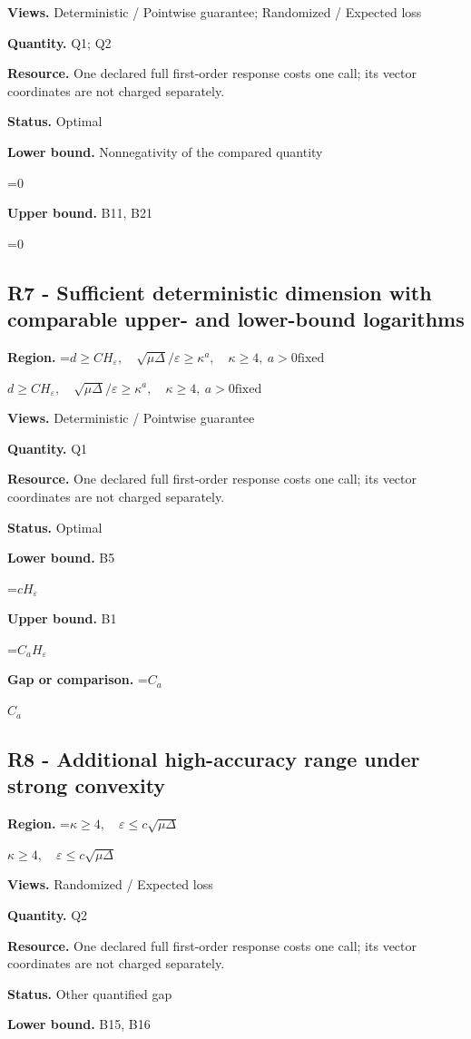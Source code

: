 \documentclass[10pt,a4paper]{article}
\newcommand{\AtlasMath}[1]{\par\begingroup\centering\setbox0=\hbox{$\displaystyle #1$}\ifdim\wd0>1.4\linewidth\typeout{ATLAS WIDE FORMULA: \the\wd0}\fi\ifdim\wd0>\linewidth\resizebox{\linewidth}{!}{\box0}\else\box0\fi\par\endgroup}
\newcommand{\AtlasInlineMath}[1]{\begingroup\setbox0=\hbox{$#1$}\ifdim\wd0>.4\linewidth\endgroup\AtlasMath{#1}\else\endgroup$#1$\fi}
\begin{document}
\textbf{Views.} Deterministic / Pointwise guarantee; Randomized / Expected loss

\textbf{Quantity.} Q1; Q2

\textbf{Resource.} One declared full first-order response costs one call; its vector coordinates are not charged separately.

\textbf{Status.} Optimal

\textbf{Lower bound.} Nonnegativity of the compared quantity

\AtlasMath{0}
\textbf{Upper bound.} B11, B21

\AtlasMath{0}
\subsection{R7 - Sufficient deterministic dimension with comparable upper- and lower-bound logarithms}
\textbf{Region.} \AtlasInlineMath{d\ge CH_\varepsilon,\quad\sqrt{\mu\Delta}/\varepsilon\ge\kappa^a,\quad\kappa\ge4,\ a>0\text{fixed}}

\textbf{Views.} Deterministic / Pointwise guarantee

\textbf{Quantity.} Q1

\textbf{Resource.} One declared full first-order response costs one call; its vector coordinates are not charged separately.

\textbf{Status.} Optimal

\textbf{Lower bound.} B5

\AtlasMath{cH_\varepsilon}
\textbf{Upper bound.} B1

\AtlasMath{C_aH_\varepsilon}
\textbf{Gap or comparison.} \AtlasInlineMath{C_a}

\subsection{R8 - Additional high-accuracy range under strong convexity}
\textbf{Region.} \AtlasInlineMath{\kappa\ge4,\quad\varepsilon\le c\sqrt{\mu\Delta}}

\textbf{Views.} Randomized / Expected loss

\textbf{Quantity.} Q2

\textbf{Resource.} One declared full first-order response costs one call; its vector coordinates are not charged separately.

\textbf{Status.} Other quantified gap

\textbf{Lower bound.} B15, B16
\end{document}
